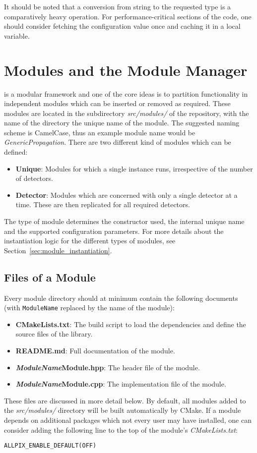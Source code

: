 \begin{warning}
    It should be noted that a conversion from string to the requested type is a comparatively heavy operation.
    For performance-critical sections of the code, one should consider fetching the configuration value once and caching it in a local variable.
\end{warning}

\section{Modules and the Module Manager}
\label{sec:module_manager}
\apsq is a modular framework and one of the core ideas is to partition functionality in independent modules which can be inserted or removed as required.
These modules are located in the subdirectory \textit{src/modules/} of the repository, with the name of the directory the unique name of the module.
The suggested naming scheme is CamelCase, thus an example module name would be \textit{GenericPropagation}.
There are two different kind of modules which can be defined:
\begin{itemize}
    \item \textbf{Unique}: Modules for which a single instance runs, irrespective of the number of detectors.
    \item \textbf{Detector}: Modules which are concerned with only a single detector at a time.
    These are then replicated for all required detectors.
\end{itemize}
The type of module determines the constructor used, the internal unique name and the supported configuration parameters.
For more details about the instantiation logic for the different types of modules, see Section~\ref{sec:module_instantiation}.

\subsection{Files of a Module}
\label{sec:module_files}
Every module directory should at minimum contain the following documents (with \texttt{ModuleName} replaced by the name of the module):
\begin{itemize}
\item \textbf{CMakeLists.txt}: The build script to load the dependencies and define the source files of the library.
\item \textbf{README.md}: Full documentation of the module.
\item \textbf{\textit{ModuleName}Module.hpp}: The header file of the module.
\item \textbf{\textit{ModuleName}Module.cpp}: The implementation file of the module.
\end{itemize}
These files are discussed in more detail below.
By default, all modules added to the \textit{src/modules/} directory will be built automatically by CMake.
If a module depends on additional packages which not every user may have installed, one can consider adding the following line to the top of the module's \textit{CMakeLists.txt}:
\begin{verbatim}
ALLPIX_ENABLE_DEFAULT(OFF)
\end{verbatim}

